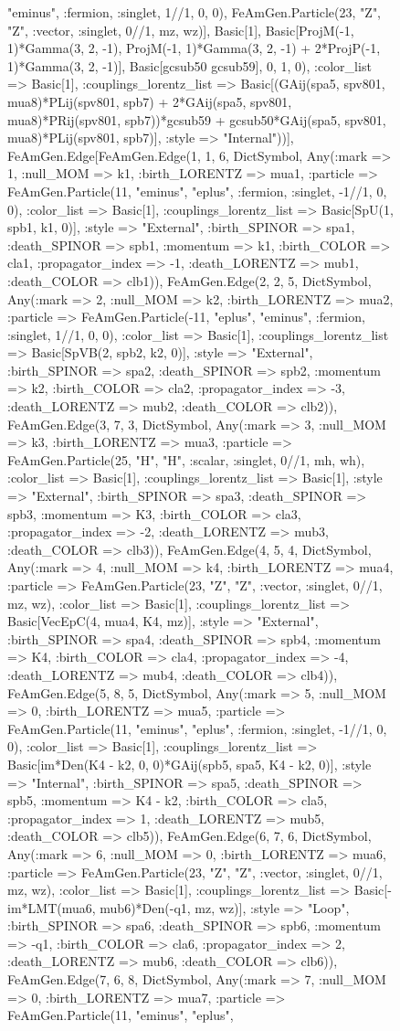 \documentclass{revtex4}
\begin{document}
\begin{figure}[!htb]
\begin{center}
{"eminus", :fermion, :singlet, 1//1, 0, 0), FeAmGen.Particle(23, "Z", "Z", :vector, :singlet, 0//1, mz, wz)], Basic[1], Basic[ProjM(-1, 1)*Gamma(3, 2, -1), ProjM(-1, 1)*Gamma(3, 2, -1) + 2*ProjP(-1, 1)*Gamma(3, 2, -1)], Basic[gcsub50 gcsub59], 0, 1, 0), :color_list => Basic[1], :couplings_lorentz_list => Basic[(GAij(spa5, spv801, mua8)*PLij(spv801, spb7) + 2*GAij(spa5, spv801, mua8)*PRij(spv801, spb7))*gcsub59 + gcsub50*GAij(spa5, spv801, mua8)*PLij(spv801, spb7)], :style => "Internal"))], FeAmGen.Edge[FeAmGen.Edge(1, 1, 6, Dict{Symbol, Any}(:mark => 1, :null_MOM => k1, :birth_LORENTZ => mua1, :particle => FeAmGen.Particle(11, "eminus", "eplus", :fermion, :singlet, -1//1, 0, 0), :color_list => Basic[1], :couplings_lorentz_list => Basic[SpU(1, spb1, k1, 0)], :style => "External", :birth_SPINOR => spa1, :death_SPINOR => spb1, :momentum => k1, :birth_COLOR => cla1, :propagator_index => -1, :death_LORENTZ => mub1, :death_COLOR => clb1)), FeAmGen.Edge(2, 2, 5, Dict{Symbol, Any}(:mark => 2, :null_MOM => k2, :birth_LORENTZ => mua2, :particle => FeAmGen.Particle(-11, "eplus", "eminus", :fermion, :singlet, 1//1, 0, 0), :color_list => Basic[1], :couplings_lorentz_list => Basic[SpVB(2, spb2, k2, 0)], :style => "External", :birth_SPINOR => spa2, :death_SPINOR => spb2, :momentum => k2, :birth_COLOR => cla2, :propagator_index => -3, :death_LORENTZ => mub2, :death_COLOR => clb2)), FeAmGen.Edge(3, 7, 3, Dict{Symbol, Any}(:mark => 3, :null_MOM => k3, :birth_LORENTZ => mua3, :particle => FeAmGen.Particle(25, "H", "H", :scalar, :singlet, 0//1, mh, wh), :color_list => Basic[1], :couplings_lorentz_list => Basic[1], :style => "External", :birth_SPINOR => spa3, :death_SPINOR => spb3, :momentum => K3, :birth_COLOR => cla3, :propagator_index => -2, :death_LORENTZ => mub3, :death_COLOR => clb3)), FeAmGen.Edge(4, 5, 4, Dict{Symbol, Any}(:mark => 4, :null_MOM => k4, :birth_LORENTZ => mua4, :particle => FeAmGen.Particle(23, "Z", "Z", :vector, :singlet, 0//1, mz, wz), :color_list => Basic[1], :couplings_lorentz_list => Basic[VecEpC(4, mua4, K4, mz)], :style => "External", :birth_SPINOR => spa4, :death_SPINOR => spb4, :momentum => K4, :birth_COLOR => cla4, :propagator_index => -4, :death_LORENTZ => mub4, :death_COLOR => clb4)), FeAmGen.Edge(5, 8, 5, Dict{Symbol, Any}(:mark => 5, :null_MOM => 0, :birth_LORENTZ => mua5, :particle => FeAmGen.Particle(11, "eminus", "eplus", :fermion, :singlet, -1//1, 0, 0), :color_list => Basic[1], :couplings_lorentz_list => Basic[im*Den(K4 - k2, 0, 0)*GAij(spb5, spa5, K4 - k2, 0)], :style => "Internal", :birth_SPINOR => spa5, :death_SPINOR => spb5, :momentum => K4 - k2, :birth_COLOR => cla5, :propagator_index => 1, :death_LORENTZ => mub5, :death_COLOR => clb5)), FeAmGen.Edge(6, 7, 6, Dict{Symbol, Any}(:mark => 6, :null_MOM => 0, :birth_LORENTZ => mua6, :particle => FeAmGen.Particle(23, "Z", "Z", :vector, :singlet, 0//1, mz, wz), :color_list => Basic[1], :couplings_lorentz_list => Basic[-im*LMT(mua6, mub6)*Den(-q1, mz, wz)], :style => "Loop", :birth_SPINOR => spa6, :death_SPINOR => spb6, :momentum => -q1, :birth_COLOR => cla6, :propagator_index => 2, :death_LORENTZ => mub6, :death_COLOR => clb6)), FeAmGen.Edge(7, 6, 8, Dict{Symbol, Any}(:mark => 7, :null_MOM => 0, :birth_LORENTZ => mua7, :particle => FeAmGen.Particle(11, "eminus", "eplus", }
\end{center}
\end{figure}
\end{document}
